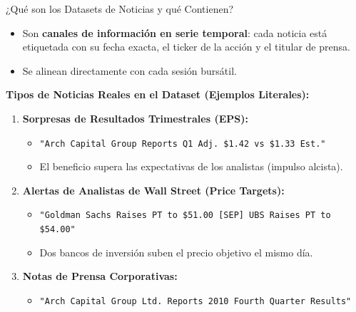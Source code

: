 \documentclass[aspectratio=169,11pt]{beamer}
\begin{document}
\begin{frame}{¿Qué son los Datasets de Noticias y qué Contienen?}
    \begin{itemize}
        \item Son \textbf{canales de información en serie temporal}: cada noticia está etiquetada con su fecha exacta, el ticker de la acción y el titular de prensa.
        \item Se alinean directamente con cada sesión bursátil.
    \end{itemize}
    
    \vspace{0.2cm}
    \textbf{Tipos de Noticias Reales en el Dataset (Ejemplos Literales):}
    \vspace{0.15cm}
    
    \begin{enumerate}
        \item \textbf{Sorpresas de Resultados Trimestrales (EPS):}
        \begin{itemize}
            \item \texttt{"Arch Capital Group Reports Q1 Adj. \$1.42 vs \$1.33 Est."}
            \item El beneficio supera las expectativas de los analistas (impulso alcista).
        \end{itemize}
        \vspace{0.1cm}
        \item \textbf{Alertas de Analistas de Wall Street (Price Targets):}
        \begin{itemize}
            \item \texttt{"Goldman Sachs Raises PT to \$51.00 [SEP] UBS Raises PT to \$54.00"}
            \item Dos bancos de inversión suben el precio objetivo el mismo día.
        \end{itemize}
        \vspace{0.1cm}
        \item \textbf{Notas de Prensa Corporativas:}
        \begin{itemize}
            \item \texttt{"Arch Capital Group Ltd. Reports 2010 Fourth Quarter Results"}
        \end{itemize}
    \end{enumerate}
\end{frame}
\end{document}
